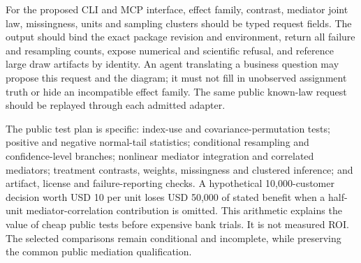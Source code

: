 For the proposed CLI and MCP interface, effect family, contrast, mediator joint
law, missingness, units and sampling clusters should be typed request fields.
The output should bind the exact package revision and environment, return all
failure and resampling counts, expose numerical and scientific refusal, and
reference large draw artifacts by identity. An agent translating a business
question may propose this request and the diagram; it must not fill in
unobserved assignment truth or hide an incompatible effect family. The same
public known-law request should be replayed through each admitted adapter.

The public test plan is specific: index-use and covariance-permutation tests;
positive and negative normal-tail statistics; conditional resampling and
confidence-level branches; nonlinear mediator integration and correlated
mediators; treatment contrasts, weights, missingness and clustered inference;
and artifact, license and failure-reporting checks. A hypothetical 10,000-customer
decision worth USD 10 per unit loses USD 50,000 of stated benefit when a
half-unit mediator-correlation contribution is omitted. This arithmetic explains
the value of cheap public tests before expensive bank trials. It is not measured
ROI. The selected comparisons remain conditional and incomplete, while
preserving the common public mediation qualification.~\citep{exec25_omed_choice}
